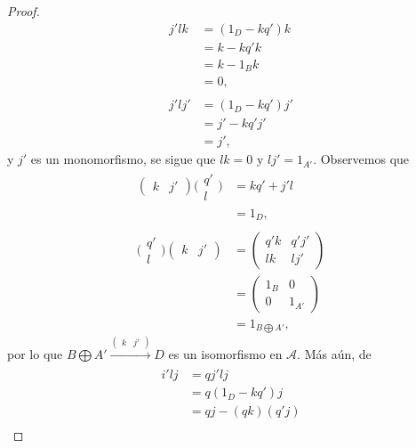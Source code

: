 \documentclass[tesis]{subfiles}
\begin{document}
\begin{proof}
    \begin{align*}
        j'lk &= (1_D-kq')k \\
             &= k-kq'k \\
             &= k-1_Bk \\
             &= 0, \\ \\
        j'lj' &= (1_D-kq')j' \\
              &= j' - kq'j' \\
              &= j',
    \end{align*}
    y $j'$ es un monomorfismo, se sigue que $lk=0$ y $lj'=1_{A'}$. Observemos que
    \begin{align*}
        (\begin{smallmatrix} k &j' \end{smallmatrix}) \big(\begin{smallmatrix} q' \\ l \end{smallmatrix}\big) &= kq' + j'l \\
                               &= 1_D, \tag{pues $j'l=1_D-kq'$} \\ \\
        \big(\begin{smallmatrix} q' \\ l \end{smallmatrix}\big) (\begin{smallmatrix} k &j' \end{smallmatrix}) &= \begin{pmatrix} q'k & q'j' \\ lk & lj' \end{pmatrix} \\
                               &= \begin{pmatrix} 1_B &0 \\ 0 &1_{A'} \end{pmatrix} \\
                               &= 1_{B\bigoplus A'},
    \end{align*}
    por lo que $B\bigoplus A'\xrightarrow[]{(\begin{smallmatrix} k &j' \end{smallmatrix})} D$ es un isomorfismo en $\mathscr{A}$. Más aún, de
    \begin{align*}
        i'lj &= qj'lj \\
             &= q(1_D-kq')j \\
             &= qj - (qk)(q'j) \\

\end{align*}
\end{proof}
\end{document}
